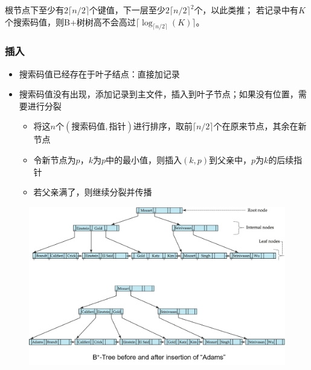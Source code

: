 根节点下至少有$2\lceil n/2\rceil$个键值，下一层至少$2\lceil n/2\rceil^2$个，以此类推；
若记录中有$K$个搜索码值，则B+树树高不会高过$\lceil\log_{\lceil n/2\rceil}(K)\rceil$。


\subsubsection{插入}
\begin{itemize}
	\item 搜索码值已经存在于叶子结点：直接加记录
	\item 搜索码值没有出现，添加记录到主文件，插入到叶子节点；如果没有位置，需要进行分裂
	\begin{itemize}
		\item 将这$n$个$(\text{搜索码值},\text{指针})$进行排序，取前$\lceil n/2\rceil$个在原来节点，其余在新节点
		\item 令新节点为$p$，$k$为$p$中的最小值，则插入$(k,p)$到父亲中，$p$为$k$的后续指针
		\item 若父亲满了，则继续分裂并传播
	\end{itemize}
\end{itemize}
\begin{figure}[H]
\centering
\includegraphics[width=0.8\linewidth]{fig/bp-tree_insertion.png}
\end{figure}


